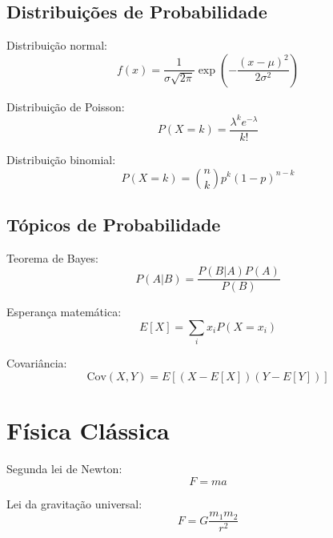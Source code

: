\subsection{Distribuições de Probabilidade}

Distribuição normal:
\begin{equation}
f(x) = \frac{1}{\sigma\sqrt{2\pi}} \exp\left(-\frac{(x-\mu)^2}{2\sigma^2}\right)
\end{equation}

Distribuição de Poisson:
\begin{equation}
P(X=k) = \frac{\lambda^k e^{-\lambda}}{k!}
\end{equation}

Distribuição binomial:
\begin{equation}
P(X=k) = \binom{n}{k}p^k(1-p)^{n-k}
\end{equation}

\subsection{Tópicos de Probabilidade}

Teorema de Bayes:
\begin{equation}
P(A|B) = \frac{P(B|A)P(A)}{P(B)}
\end{equation}

Esperança matemática:
\begin{equation}
E[X] = \sum_{i} x_i P(X=x_i)
\end{equation}

Covariância:
\begin{equation}
\text{Cov}(X,Y) = E[(X - E[X])(Y - E[Y])]
\end{equation}


\section{Física Clássica}

Segunda lei de Newton:
\begin{equation}
F = ma
\end{equation}

Lei da gravitação universal:
\begin{equation}
F = G\frac{m_1 m_2}{r^2}
\end{equation}

